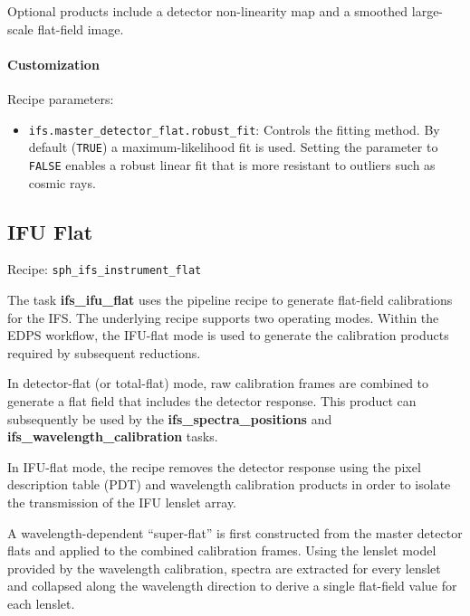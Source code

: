 Optional products include a detector non-linearity map and a smoothed
large-scale flat-field image.

\paragraph{Customization}

Recipe parameters:

\begin{itemize}

\item \texttt{ifs.master\_detector\_flat.robust\_fit}:
Controls the fitting method. By default
(\texttt{TRUE}) a maximum-likelihood fit is used. Setting the parameter to
\texttt{FALSE} enables a robust linear fit that is more resistant to
outliers such as cosmic rays.
\end{itemize}


\subsection{IFU Flat}

Recipe:
\texttt{sph\_ifs\_instrument\_flat}

The task \textbf{ifs\_ifu\_flat} uses the pipeline recipe to generate
flat-field calibrations for the IFS. The underlying recipe supports two operating modes. Within the EDPS workflow, the IFU-flat mode is used to generate the calibration products required by subsequent reductions.

In detector-flat (or total-flat) mode, raw calibration frames are combined
to generate a flat field that includes the detector response. This product
can subsequently be used by the
\textbf{ifs\_spectra\_positions} and
\textbf{ifs\_wavelength\_calibration} tasks.

In IFU-flat mode, the recipe removes the detector response using the pixel
description table (PDT) and wavelength calibration products in order to
isolate the transmission of the IFU lenslet array.

A wavelength-dependent ``super-flat'' is first constructed from the master
detector flats and applied to the combined calibration frames. Using the
lenslet model provided by the wavelength calibration, spectra are extracted
for every lenslet and collapsed along the wavelength direction to derive a
single flat-field value for each lenslet.

